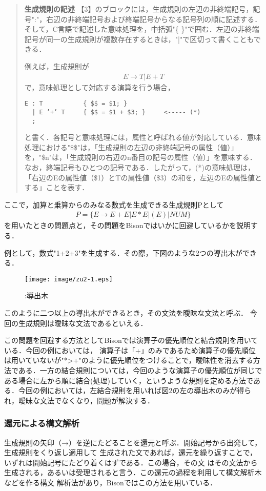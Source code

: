 \documentclass[a4j]{jsarticle}  %
\begin{document}
\begin{quote}
{\bf 生成規則の記述} 【3】のブロックには，生成規則の左辺の非終端記号，記号":"，右辺の非終端記号および終端記号からなる記号列の順に記述する．そして，C言語で記述した意味処理を，中括弧"\{  \}"で囲む．左辺の非終端記号が同一の生成規則が複数存在するときは，"|"で区切って書くこともできる．

例えば，生成規則が
\begin{eqnarray*}
E→T|E+T
\end{eqnarray*}
で，意味処理として対応する演算を行う場合，
\begin{verbatim}
E : T           { $$ = $1; }
  | E ’+’ T     { $$ = $1 + $3; }     <----- (*)
  ;
\end{verbatim}
と書く．各記号と意味処理には，属性と呼ばれる値が対応している．意味処理における"\$\$"は，「生成規則の左辺の非終端記号の属性（値）」を，"\$n"は，「生成規則の右辺のn番目の記号の属性（値）」を意味する．なお，終端記号もひとつの記号である．したがって，(*)の意味処理は，「右辺のEの属性値（\$1）とTの属性値（\$3）の和を，左辺のEの属性値とする」ことを表す．
\end{quote}

ここで，加算と乗算からのみなる数式を生成できる生成規則Pとして
\begin{eqnarray*}
P=\{E→E+E|E*E|(E)|NUM\}
\end{eqnarray*}
を用いたときの問題点と，その問題をBisonではいかに回避しているかを説明する．

例として，数式"1+2+3"を生成する．その際，下図のような2つの導出木ができる．

\begin{figure}[htbp]
\centering\texttt{[image: image/zu2-1.eps]}
\caption{:導出木}
\end{figure}

このように二つ以上の導出木ができるとき，その文法を曖昧な文法と呼ぶ．
今回の生成規則は曖昧な文法であるといえる．

この問題を回避する方法としてBisonでは演算子の優先順位と結合規則を用いている．今回の例においては，
演算子は「+」のみであるため演算子の優先順位は用いていないが"*>+"のように優先順位をつけることで，曖昧性を消去する方法である．一方の結合規則については，今回のような演算子の優先順位が同じである場合に左から順に結合(処理)していく，というような規則を定める方法である．今回の例においては，左結合規則を用いれば図2の左の導出木のみが得られ，曖昧な文法でなくなり，問題が解決する．

\subsubsection{還元による構文解析}
生成規則の矢印（→）を逆にたどることを還元と呼ぶ．開始記号から出発して，生成規則をくり返し適用して
生成された文であれば，還元を繰り返すことで，いずれは開始記号にたどり着くはずである．この場合，その文
はその文法から生成される，あるいは受理されると言う．この還元の過程を利用して構文解析木などを作る構文
解析法があり，Bisonではこの方法を用いている．
\end{document}
